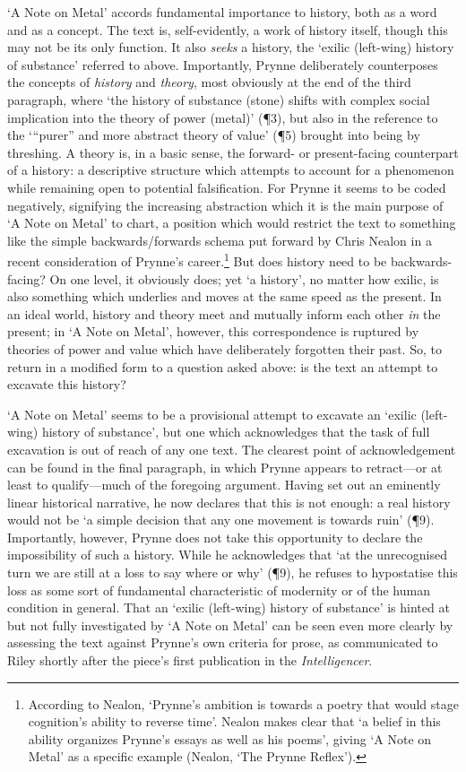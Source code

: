 \documentclass[]{article}
\begin{document}
‘A Note on Metal’ accords fundamental importance to history, both as a
word and as a concept. The text is, self-evidently, a work of history
itself, though this may not be its only function. It also \emph{seeks} a
history, the ‘exilic (left-wing) history of substance’ referred to
above. Importantly, Prynne deliberately counterposes the concepts of
\emph{history} and \emph{theory}, most obviously at the end of the third
paragraph, where ‘the history of substance (stone) shifts with complex
social implication into the theory of power (metal)’ (¶3), but also in
the reference to the ‘“purer” and more abstract theory of value’ (¶5)
brought into being by threshing. A theory is, in a basic sense, the
forward- or present-facing counterpart of a history: a descriptive
structure which attempts to account for a phenomenon while remaining
open to potential falsification. For Prynne it seems to be coded
negatively, signifying the increasing abstraction which it is the main
purpose of ‘A Note on Metal’ to chart, a position which would restrict
the text to something like the simple backwards/forwards schema put
forward by Chris Nealon in a recent consideration of Prynne’s
career.\footnote{According to Nealon, ‘Prynne’s ambition is towards a
  poetry that would stage cognition’s ability to reverse time’. Nealon
  makes clear that ‘a belief in this ability organizes Prynne’s essays
  as well as his poems’, giving ‘A Note on Metal’ as a specific example
  (Nealon, ‘The Prynne Reflex’).} But does history need to be
backwards-facing? On one level, it obviously does; yet ‘a history’, no
matter how exilic, is also something which underlies and moves at the
same speed as the present. In an ideal world, history and theory meet
and mutually inform each other \emph{in} the present; in ‘A Note on
Metal’, however, this correspondence is ruptured by theories of power
and value which have deliberately forgotten their past. So, to return in
a modified form to a question asked above: is the text an attempt to
excavate this history?

‘A Note on Metal’ seems to be a provisional attempt to excavate an
‘exilic (left-wing) history of substance’, but one which acknowledges
that the task of full excavation is out of reach of any one text. The
clearest point of acknowledgement can be found in the final paragraph,
in which Prynne appears to retract—or at least to qualify—much of the
foregoing argument. Having set out an eminently linear historical
narrative, he now declares that this is not enough: a real history would
not be ‘a simple decision that any one movement is towards ruin’ (¶9).
Importantly, however, Prynne does not take this opportunity to declare
the impossibility of such a history. While he acknowledges that ‘at the
unrecognised turn we are still at a loss to say where or why’ (¶9), he
refuses to hypostatise this loss as some sort of fundamental
characteristic of modernity or of the human condition in general. That
an ‘exilic (left-wing) history of substance’ is hinted at but not fully
investigated by ‘A Note on Metal’ can be seen even more clearly by
assessing the text against Prynne’s own criteria for prose, as
communicated to Riley shortly after the piece’s first publication in the
\emph{Intelligencer}.
\end{document}
